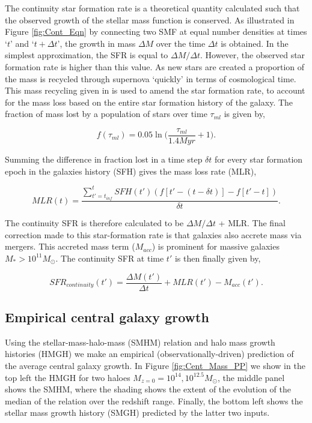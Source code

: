 The continuity star formation rate is a theoretical quantity calculated such that the observed growth of the stellar mass function is conserved. As illustrated in Figure \ref{fig:Cont_Eqn} by connecting two SMF at equal number densities at times `$t$' and `$t + \Delta t$', the growth in mass $\Delta M$ over the time $\Delta t$ is obtained. In the simplest approximation, the SFR is equal to $\Delta M / \Delta t$. However, the observed star formation rate is higher than this value. As new stars are created a proportion of the mass is recycled through supernova `quickly' in terms of cosmological time. This mass recycling given in \citet{Moster2018Emerge10} is used to amend the star formation rate, to account for the mass loss based on the entire star formation history of the galaxy. The fraction of mass lost by a population of stars over time $\tau_{ml}$ is given by,

\begin{equation}
\label{eqn:f_ml}
f(\tau_{ml}) = 0.05 \ln \Big(\frac{\tau_{ml}}{1.4 Myr}+1\Big).
\end{equation}

Summing the difference in fraction lost in a time step $\delta t$ for every star formation epoch in the galaxies history (SFH) gives the mass loss rate (MLR), 

\begin{equation}
\label{eqn:MLR}
MLR(t) = \frac{ \sum_{t' = t_{inf}}^{t} SFH(t')(f[t' - (t-\delta t)]-f[t' - t]) }{\delta t}.
\end{equation}

The continuity SFR is therefore calculated to be $\Delta M / \Delta t$ + MLR. The final correction made to this star-formation rate is that galaxies also accrete mass via mergers. This accreted mass term ($M_{acc}$) is prominent for massive galaxies $M_* > 10^{11} M_{\odot}$. The continuity SFR at time $t'$ is then finally given by,

\begin{equation}
    SFR_{continuity}(t') = \frac{\Delta M(t')}{\Delta t} + MLR(t') - M_{acc}(t').
\end{equation}

\subsection{Empirical central galaxy growth}

Using the stellar-mass-halo-mass (SMHM) relation and halo mass growth histories (HMGH) we make an empirical (observationally-driven) prediction of the average central galaxy growth. In Figure \ref{fig:Cent_Mass_PP} we show in the top left the HMGH for two haloes $M_{z=0} = 10^{14}, 10^{12.5} M_{\odot}$, the middle panel shows the SMHM, where the shading shows the extent of the evolution of the median of the relation over the redshift range. Finally, the bottom left shows the stellar mass growth history (SMGH) predicted by the latter two inputs.

